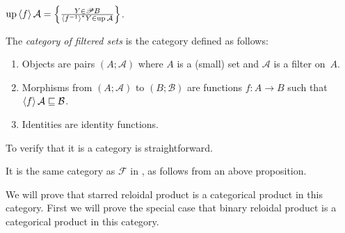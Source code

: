 \begin{cor}
$\operatorname{up}\left\langle f\right\rangle\mathcal{A} = \left\{ \frac{Y\in\mathscr{P} B}{\left\langle f^{-1}\right\rangle ^{\ast}Y\in\operatorname{up}\mathcal{A}}\right\}$.
\end{cor}

\begin{defn}
The \emph{category of filtered sets} is the category defined as follows:
\begin{enumerate}
\item Objects are pairs $(A;\mathcal{A})$ where $A$ is a (small) set and $\mathcal{A}$ is a filter on~$A$.
\item Morphisms from $(A;\mathcal{A})$ to $(B;\mathcal{B})$ are functions $f:A\rightarrow B$ such that
$\left\langle f\right\rangle\mathcal{A} \sqsubseteq \mathcal{B}$.
\item Identities are identity functions.
\end{enumerate}
\end{defn}

To verify that it is a category is straightforward.

It is the same category as $\mathscr{F}$ in \cite{filt-cat}, as follows from an above proposition.

We will prove that starred reloidal product is a categorical product in this category.
First we will prove the special case that binary reloidal product is a categorical product in this category.